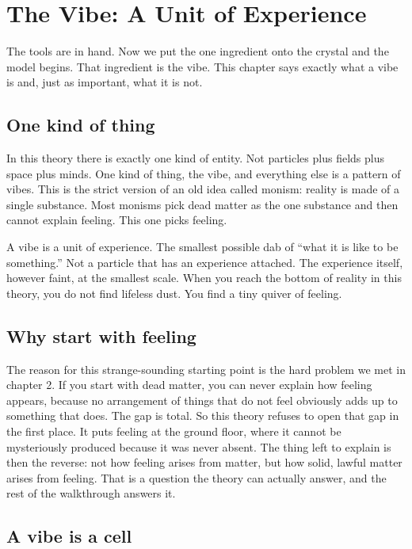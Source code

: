 \section{The Vibe: A Unit of Experience}

The tools are in hand. Now we put the one ingredient onto the crystal and the model begins. That ingredient is the vibe. This chapter says exactly what a vibe is and, just as important, what it is not.

\subsection{One kind of thing}

In this theory there is exactly one kind of entity. Not particles plus fields plus space plus minds. One kind of thing, the vibe, and everything else is a pattern of vibes. This is the strict version of an old idea called monism: reality is made of a single substance. Most monisms pick dead matter as the one substance and then cannot explain feeling. This one picks feeling.

A vibe is a unit of experience. The smallest possible dab of ``what it is like to be something.'' Not a particle that has an experience attached. The experience itself, however faint, at the smallest scale. When you reach the bottom of reality in this theory, you do not find lifeless dust. You find a tiny quiver of feeling.

\subsection{Why start with feeling}

The reason for this strange-sounding starting point is the hard problem we met in chapter 2. If you start with dead matter, you can never explain how feeling appears, because no arrangement of things that do not feel obviously adds up to something that does. The gap is total. So this theory refuses to open that gap in the first place. It puts feeling at the ground floor, where it cannot be mysteriously produced because it was never absent. The thing left to explain is then the reverse: not how feeling arises from matter, but how solid, lawful matter arises from feeling. That is a question the theory can actually answer, and the rest of the walkthrough answers it.

\subsection{A vibe is a cell}

